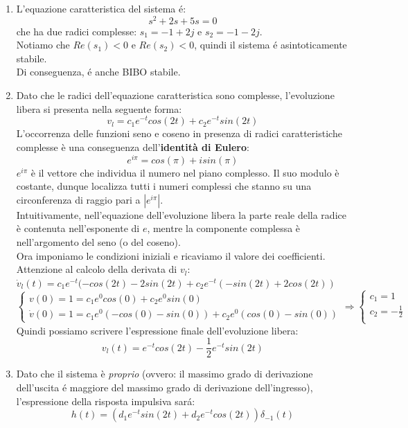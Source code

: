 \documentclass[12pt,a4paper]{article}
\begin{document}
	\begin{enumerate}
		\item L'equazione caratteristica del sistema \'e:
		\[
			s^2 + 2s + 5s = 0
		\]
		che ha due radici complesse: $s_1 = -1+2j$ e $s_2 = -1-2j$.\\
		Notiamo che $Re(s_1) < 0$ e $Re(s_2) < 0$, quindi il sistema \'e asintoticamente stabile.\\
		Di conseguenza, \'e anche BIBO stabile.
		\item Dato che le radici dell'equazione caratteristica sono complesse, l'evoluzione libera si presenta nella seguente forma:
		\[
			v_l = c_1e^{-t}cos(2t) + c_2e^{-t}sin(2t)
		\]
		L'occorrenza delle funzioni seno e coseno in presenza di radici caratteristiche complesse è una conseguenza dell'\textbf{identità di Eulero}:
		\[
			e^{i\pi} = cos(\pi) + i sin(\pi)
		\]
		$e^{i\pi}$ è il vettore che individua il numero nel piano complesso. Il suo modulo è costante, dunque localizza tutti i numeri complessi che stanno su una circonferenza di raggio pari a $|e^{i\pi}|$.\\
		Intuitivamente, nell'equazione dell'evoluzione libera la parte reale della radice è contenuta nell'esponente di $e$, mentre la componente complessa è nell'argomento del seno (o del coseno).\\
		Ora imponiamo le condizioni iniziali e ricaviamo il valore dei coefficienti.\\
		Attenzione al calcolo della derivata di $v_l$:\\
		$\dot{v}_l(t) = c_1e^{-t}(-cos(2t)-2sin(2t) + c_2e^{-t}(-sin(2t)+2cos(2t))$
		\[
			\begin{cases}
				v(0) = 1 = c_1e^0cos(0) + c_2e^0sin(0)\\
				\dot{v}(0) = 1 = c_1e^0(-cos(0)-sin(0)) + c_2e^0(cos(0)-sin(0))
			\end{cases}
			\Rightarrow
			\begin{cases}
				c_1 = 1\\
				c_2 = -\frac{1}{2}\\
			\end{cases}
		\]
		Quindi possiamo scrivere l'espressione finale dell'evoluzione libera:
		\[
			v_l(t) = e^{-t}cos(2t)-\frac{1}{2}e^{-t}sin(2t)
		\]
		\item Dato che il sistema è \textit{proprio} (ovvero: il massimo grado di derivazione dell'uscita \'e maggiore del massimo grado di derivazione dell'ingresso), l'espressione della risposta impulsiva sar\'a:
		\[
			h(t) = (d_1e^{-t}sin(2t) + d_2e^{-t}cos(2t))\delta_{-1}(t)
\]
\end{enumerate}
\end{document}
